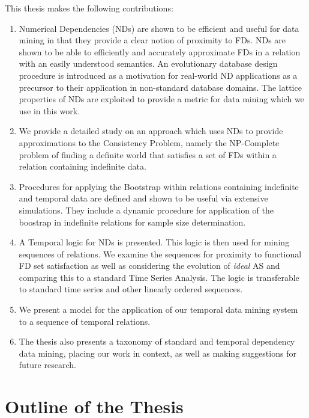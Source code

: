 This thesis makes the following contributions:
\begin{enumerate}
\item Numerical Dependencies (NDs) are shown to be efficient and useful for 
data mining in that they provide a clear notion of proximity to FDs.
NDs are shown to be able to efficiently and accurately approximate FDs
in a relation with an easily understood semantics. 
An evolutionary database design procedure is introduced as a 
motivation for real-world ND applications as a precursor to their application
in non-standard database domains. The lattice properties of NDs are
exploited to provide a metric for data mining which we use in this work. 
\item We provide a detailed study on an approach which uses NDs to
provide approximations to the Consistency Problem, namely the
NP-Complete problem of finding a definite world that satisfies a set
of FDs within a relation containing indefinite data. 
\item Procedures for applying the Bootstrap within relations containing
indefinite and temporal data are defined and shown to be useful via extensive
simulations. They include a dynamic procedure for application of the
boostrap in indefinite relations for sample size determination. 
\item A Temporal logic for NDs is presented. This logic is then used
for mining sequences of relations. We examine the sequences for proximity
to functional FD set satisfaction as well as considering the evolution
of {\em ideal} AS and comparing this to a standard Time Series
Analysis. The logic is transferable to standard time series and other
linearly ordered sequences.
\item We present a model for the application of our temporal data
mining system to a sequence of temporal relations.
\item The thesis also presents a taxonomy of standard and temporal 
dependency data mining, 
placing our work in context, as well as making suggestions for future research.
\end{enumerate}




\section{Outline of the Thesis}

